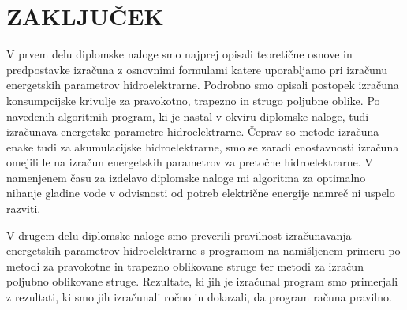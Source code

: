 
\chapter{ZAKLJUČEK}

V prvem delu diplomske naloge smo najprej opisali teoretične osnove in predpostavke izračuna z osnovnimi formulami katere uporabljamo pri izračunu energetskih parametrov hidroelektrarne. Podrobno smo opisali postopek izračuna konsumpcijske krivulje za pravokotno, trapezno in strugo poljubne oblike. Po navedenih algoritmih program, ki je nastal v okviru diplomske naloge, tudi izračunava energetske parametre hidroelektrarne. Čeprav so metode izračuna enake tudi za akumulacijske hidroelektrarne, smo se zaradi enostavnosti izračuna omejili le na izračun energetskih parametrov za pretočne hidroelektrarne. V namenjenem času za izdelavo diplomske naloge mi algoritma za optimalno nihanje gladine vode v odvisnosti od potreb električne energije namreč ni uspelo razviti.


V drugem delu diplomske naloge smo preverili pravilnost izračunavanja energetskih parametrov hidroelektrarne s programom na namišljenem primeru po metodi za pravokotne in trapezno oblikovane struge ter metodi za izračun poljubno oblikovane struge. Rezultate, ki jih je izračunal program smo primerjali z rezultati, ki smo jih izračunali ročno in dokazali, da program računa pravilno.

